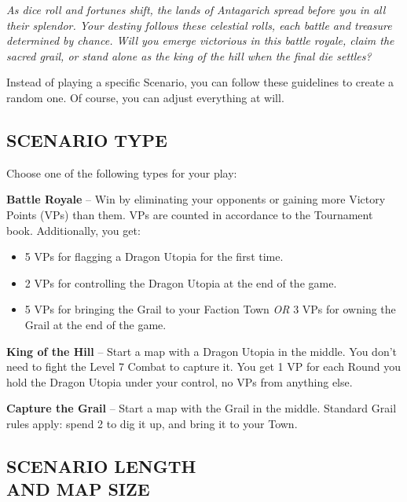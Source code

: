 
\begin{multicols*}{2}

\textit{As dice roll and fortunes shift, the lands of Antagarich spread before you in all their splendor.
  Your destiny follows these celestial rolls, each battle and treasure determined by chance.
  Will you emerge victorious in this battle royale, claim the sacred grail, or stand alone as the king of the hill when the final die settles?  %
}

Instead of playing a specific Scenario, you can follow these guidelines to create a random one.
Of course, you can adjust everything at will.

\subsection*{\MakeUppercase{Scenario Type}}

Choose one of the following types for your play:

\textbf{Battle Royale} -- Win by eliminating your opponents or gaining more Victory Points (VPs) than them.
VPs are counted in accordance to the Tournament book.
Additionally, you get:
\begin{itemize}
  \item 5 VPs for flagging a Dragon Utopia for the first time.
  \item 2 VPs for controlling the Dragon Utopia at the end of the game.
  \item 5 VPs for bringing the Grail to your Faction Town \textit{OR} 3 VPs for owning the Grail  at the end of the game.
\end{itemize}

\textbf{King of the Hill} -- Start a map with a Dragon Utopia in the middle.
You don't need to fight the Level 7 Combat to capture it.
You get 1 VP for each Round you hold the Dragon Utopia under your control, no VPs from anything else.

\textbf{Capture the Grail} -- Start a map with the Grail in the middle.
Standard Grail rules apply: spend 2  to dig it up, and bring it to your Town.
\vspace*{\fill}
\columnbreak

\subsection*{\MakeUppercase{Scenario Length\\and Map Size}}


\end{multicols*}
